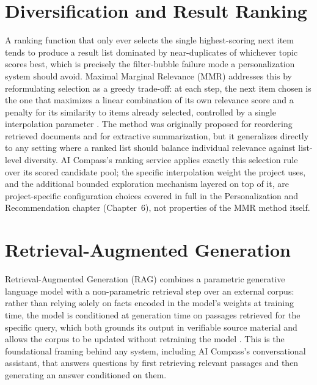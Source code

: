 \section{Diversification and Result Ranking}
\label{sec:background-mmr}

A ranking function that only ever selects the single highest-scoring next item tends to produce a result list dominated by near-duplicates of whichever topic scores best, which is precisely the filter-bubble failure mode a personalization system should avoid. Maximal Marginal Relevance (MMR) addresses this by reformulating selection as a greedy trade-off: at each step, the next item chosen is the one that maximizes a linear combination of its own relevance score and a penalty for its similarity to items already selected, controlled by a single interpolation parameter \cite{carbonell1998mmr}. The method was originally proposed for reordering retrieved documents and for extractive summarization, but it generalizes directly to any setting where a ranked list should balance individual relevance against list-level diversity. AI Compass's ranking service applies exactly this selection rule over its scored candidate pool; the specific interpolation weight the project uses, and the additional bounded exploration mechanism layered on top of it, are project-specific configuration choices covered in full in the Personalization and Recommendation chapter (Chapter~6), not properties of the MMR method itself.

\section{Retrieval-Augmented Generation}
\label{sec:background-rag}

Retrieval-Augmented Generation (RAG) combines a parametric generative language model with a non-parametric retrieval step over an external corpus: rather than relying solely on facts encoded in the model's weights at training time, the model is conditioned at generation time on passages retrieved for the specific query, which both grounds its output in verifiable source material and allows the corpus to be updated without retraining the model \cite{lewis2020rag}. This is the foundational framing behind any system, including AI Compass's conversational assistant, that answers questions by first retrieving relevant passages and then generating an answer conditioned on them.

